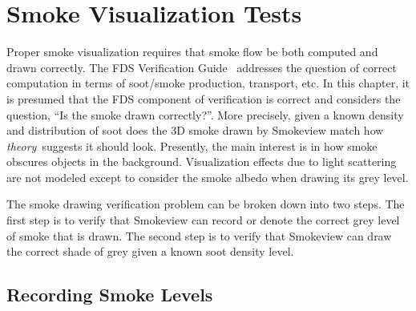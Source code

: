 \documentclass[11pt,twoside]{book}
\newcommand{\figoptions}{hbp}
\begin{document}




\chapter{Smoke Visualization Tests}

Proper smoke visualization requires that smoke flow be both computed and drawn correctly.
The FDS Verification Guide~\cite{FDS_Verification_Guide} addresses the question of correct
computation in terms of soot/smoke production, transport, etc.  In this chapter, it is presumed that the FDS component of verification is correct and considers the question, ``Is the smoke drawn correctly?''.  More precisely, given a known density and distribution of soot does the 3D smoke drawn by Smokeview match how {\em theory}\ suggests it should look.  Presently, the main interest is in how smoke obscures objects in the background.  Visualization effects due to light scattering are not modeled except to consider the smoke albedo when drawing its grey level.

The smoke drawing verification problem can be broken down into two steps.  The first step is to verify that Smokeview can record or denote the correct grey level of smoke that is drawn.
The second step is to verify that Smokeview can draw the correct shade of grey given a known soot density level.

\section{Recording Smoke Levels}
\end{document}
